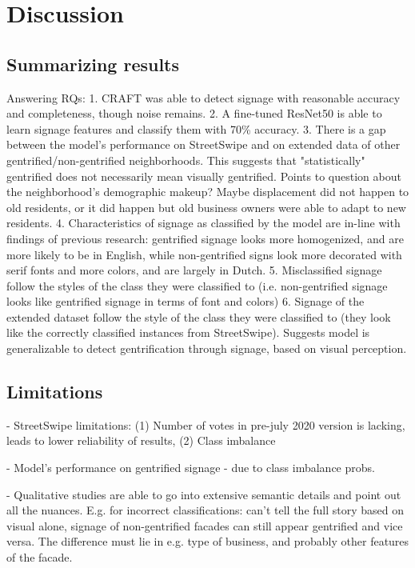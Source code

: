 \section{Discussion}
\label{sec:discussion}

\subsection{Summarizing results}
Answering RQs:
1. CRAFT was able to detect signage with reasonable accuracy and completeness, though noise remains.
2. A fine-tuned ResNet50 is able to learn signage features and classify them with 70\% accuracy.
3. There is a gap between the model's performance on StreetSwipe and on extended data of other gentrified/non-gentrified neighborhoods. This suggests that "statistically" gentrified does not necessarily mean visually gentrified. Points to question about the neighborhood's demographic makeup? Maybe displacement did not happen to old residents, or it did happen but old business owners were able to adapt to new residents.
4. Characteristics of signage as classified by the model are in-line with findings of previous research: gentrified signage looks more homogenized, and are more likely to be in English, while non-gentrified signs look more decorated with serif fonts and more colors, and are largely in Dutch.
5. Misclassified signage follow the styles of the class they were classified to (i.e. non-gentrified signage looks like gentrified signage in terms of font and colors)
6. Signage of the extended dataset follow the style of the class they were classified to (they look like the correctly classified instances from StreetSwipe). Suggests model is generalizable to detect gentrification through signage, based on visual perception.

\subsection{Limitations}
- StreetSwipe limitations: (1) Number of votes in pre-july 2020 version is lacking, leads to lower reliability of results, (2) Class imbalance

- Model's performance on gentrified signage - due to class imbalance probs.

- Qualitative studies are able to go into extensive semantic details and point out all the nuances. E.g. for incorrect classifications: can't tell the full story based on visual alone, signage of non-gentrified facades can still appear gentrified and vice versa. The difference must lie in e.g. type of business, and probably other features of the facade.
